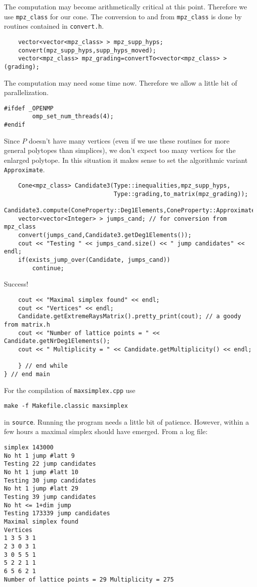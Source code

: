 \documentclass[12pt,a4paper]{scrartcl}
\theoremstyle{definition}
\begin{document}
\begin{small}
The computation may become arithmetically critical at this point. Therefore we use \verb|mpz_class| for our cone. The conversion to and from \verb|mpz_class| is done by routines contained in \verb|convert.h|.
\begin{Verbatim}
    vector<vector<mpz_class> > mpz_supp_hyps;
    convert(mpz_supp_hyps,supp_hyps_moved);
    vector<mpz_class> mpz_grading=convertTo<vector<mpz_class> >(grading);
\end{Verbatim}
The computation may need some time now. Therefore we allow a little bit of parallelization.
\begin{Verbatim}
#ifdef _OPENMP
        omp_set_num_threads(4);
#endif
\end{Verbatim}
Since $P$ doesn't have many vertices (even if we use these routines for more general polytopes than simplices), we don't expect too many vertices for the enlarged polytope. In this situation it makes sense to set the algorithmic variant \verb|Approximate|.
\begin{Verbatim}
    Cone<mpz_class> Candidate3(Type::inequalities,mpz_supp_hyps,
                               Type::grading,to_matrix(mpz_grading));
    Candidate3.compute(ConeProperty::Deg1Elements,ConeProperty::Approximate);
    vector<vector<Integer> > jumps_cand; // for conversion from mpz_class
    convert(jumps_cand,Candidate3.getDeg1Elements());
    cout << "Testing " << jumps_cand.size() << " jump candidates" << endl;
    if(exists_jump_over(Candidate, jumps_cand))
        continue;
\end{Verbatim}
Success!
\begin{Verbatim}
    cout << "Maximal simplex found" << endl;
    cout << "Vertices" << endl;
    Candidate.getExtremeRaysMatrix().pretty_print(cout); // a goody from matrix.h
    cout << "Number of lattice points = " << Candidate.getNrDeg1Elements();
    cout << " Multiplicity = " << Candidate.getMultiplicity() << endl; 

    } // end while
} // end main
\end{Verbatim}

For the compilation of \verb|maxsimplex.cpp| use
\begin{Verbatim}
make -f Makefile.classic maxsimplex
\end{Verbatim}
in \verb|source|. Running the program needs a little bit of patience. However, within a few hours a maximal simplex should have emerged. From a log file:
\begin{Verbatim}
simplex 143000
No ht 1 jump #latt 9
Testing 22 jump candidates
No ht 1 jump #latt 10
Testing 30 jump candidates
No ht 1 jump #latt 29
Testing 39 jump candidates
No ht <= 1+dim jump
Testing 173339 jump candidates
Maximal simplex found
Vertices
1 3 5 3 1
2 3 0 3 1
3 0 5 5 1
5 2 2 1 1
6 5 6 2 1
Number of lattice points = 29 Multiplicity = 275
\end{Verbatim}

\end{small}
\end{document}
